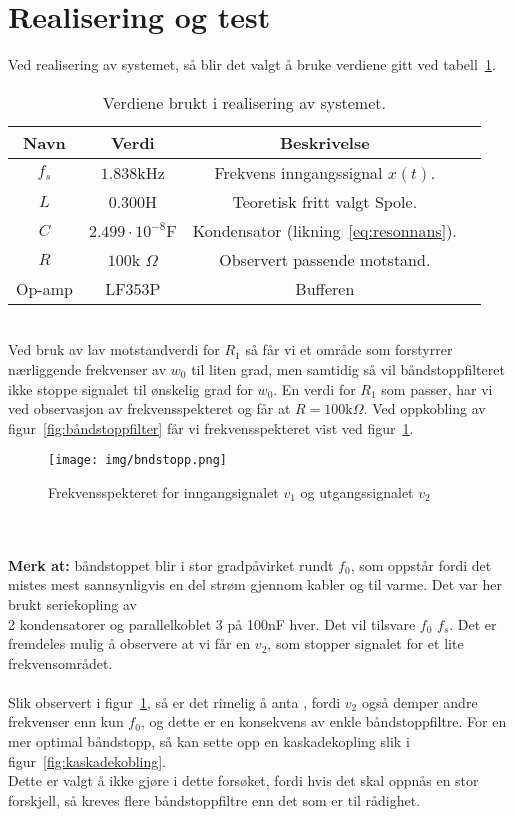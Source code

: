 \documentclass[a4paper,11pt,norsk]{article}
\begin{document}
\section{Realisering og test}
Ved realisering av systemet, så blir det valgt å bruke verdiene gitt ved tabell~\ref{table:variabler}.
\label{sec:realisering}
\\
\begin{table}[htbp]
\centering
\begin{tabular}{ |c|c|c|c| } 
\hline
\textbf{Navn} & \textbf{Verdi} & \textbf{Beskrivelse}\\
\hline
$f_s$ & $1.838$kHz & Frekvens inngangssignal $x(t)$.  \\
\hline
$L$ & $0.300$H & Teoretisk fritt valgt Spole. \\
\hline
$C$ & $2.499\cdot 10^{-8}$F & Kondensator (likning~\ref{eq:resonnans}).\\
\hline
$R$ & $100$k $\Omega$ & Observert passende motstand.  \\ 
\hline
Op-amp & LF353P & Bufferen \\ 
\hline
\end{tabular}
\caption{Verdiene brukt i realisering av systemet.}
\label{table:variabler}
\end{table}
\\

Ved bruk av lav motstandverdi for $R_1$ så får vi et område som forstyrrer nærliggende frekvenser av $w_0$ til liten grad, men samtidig så vil båndstoppfilteret ikke stoppe signalet til ønskelig grad for $w_0$. En verdi for $R_1$ som passer, har vi ved observasjon av frekvensspekteret og får at $R = 100$k$\Omega$. Ved oppkobling av figur~\ref{fig:båndstoppfilter} får vi frekvensspekteret vist ved figur~\ref{fig:freqspectre}.
\begin{figure}[htbp]
    \centering
    \texttt{[image: img/bndstopp.png]}
    \caption{Frekvensspekteret for inngangsignalet $v_1$ og utgangssignalet $v_2$}
  \label{fig:freqspectre}
\end{figure}
\\
\\
\textbf{Merk at: } båndstoppet blir i stor gradpåvirket rundt $f_0$, som oppstår fordi det mistes mest sannsynligvis en del strøm gjennom kabler og til varme.  Det var her brukt seriekopling av \\ 2 kondensatorer og parallelkoblet 3 på 100nF hver. Det vil tilsvare $f_0$  \approx $f_s$. Det er fremdeles mulig å observere at vi får en $v_2$, som stopper signalet for et lite frekvensområdet.
\\\\
Slik observert i figur~\ref{fig:freqspectre}, så er det rimelig å anta , fordi $v_2$ også demper andre frekvenser enn kun $f_0$, og dette er en konsekvens av enkle båndstoppfiltre. For en mer optimal båndstopp, så kan sette opp en kaskadekopling slik i figur~\ref{fig:kaskadekobling}. \\
Dette er valgt å ikke gjøre i dette forsøket, fordi hvis det skal oppnås en stor forskjell, så kreves flere båndstoppfiltre enn det som er til rådighet.\newpage
\end{document}
